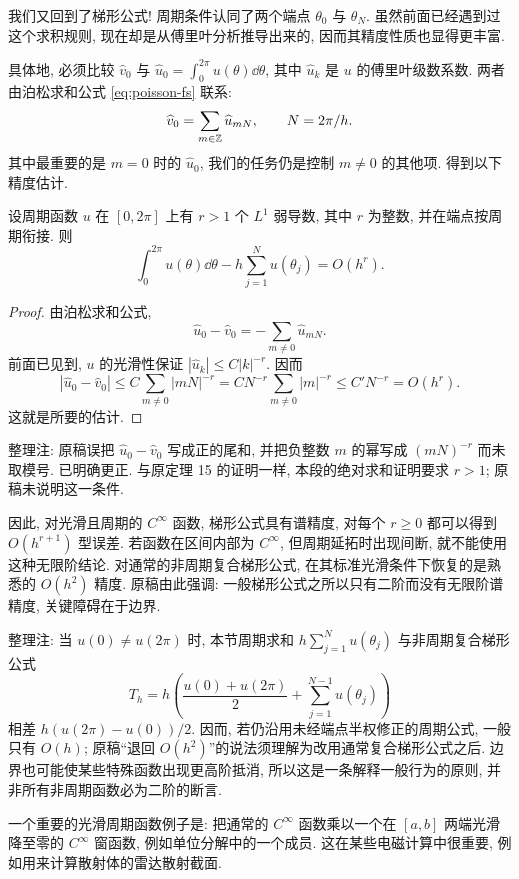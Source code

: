 我们又回到了梯形公式! 周期条件认同了两个端点 $\theta_0$ 与 $\theta_N$. 虽然前面已经遇到过这个求积规则, 现在却是从傅里叶分析推导出来的, 因而其精度性质也显得更丰富.

具体地, 必须比较 $\widehat v_0$ 与 $\widehat u_0=\int_0^{2\pi}u(\theta)\dd\theta$, 其中 $\widehat u_k$ 是 $u$ 的傅里叶级数系数. 两者由泊松求和公式 \eqref{eq:poisson-fs} 联系:
\[
\widehat v_0=\sum_{m\in\mathbb Z}\widehat u_{mN},\qquad N=2\pi/h.
\]
其中最重要的是 $m=0$ 时的 $\widehat u_0$, 我们的任务仍是控制 $m\ne0$ 的其他项. 得到以下精度估计.

\begin{theorem}[周期梯形公式的精度]\label{thm:periodic-trapezoid}
设周期函数 $u$ 在 $[0,2\pi]$ 上有 $r>1$ 个 $L^1$ 弱导数, 其中 $r$ 为整数, 并在端点按周期衔接. 则
\[
\int_0^{2\pi}u(\theta)\dd\theta
-h\sum_{j=1}^{N}u(\theta_j)=O(h^r).
\]
\end{theorem}
\begin{proof}
由泊松求和公式,
\[
\widehat u_0-\widehat v_0=-\sum_{m\ne0}\widehat u_{mN}.
\]
前面已见到, $u$ 的光滑性保证 $|\widehat u_k|\le C|k|^{-r}$. 因而
\[
|\widehat u_0-\widehat v_0|
\le C\sum_{m\ne0}|mN|^{-r}
=C N^{-r}\sum_{m\ne0}|m|^{-r}\le C'N^{-r}=O(h^r).
\]
这就是所要的估计.
\end{proof}
\begin{remark}
整理注: 原稿误把 $\widehat u_0-\widehat v_0$ 写成正的尾和, 并把负整数 $m$ 的幂写成 $(mN)^{-r}$ 而未取模号. 已明确更正. 与原定理 15 的证明一样, 本段的绝对求和证明要求 $r>1$; 原稿未说明这一条件.
\end{remark}

因此, 对光滑且周期的 $C^\infty$ 函数, 梯形公式具有谱精度, 对每个 $r\ge0$ 都可以得到 $O(h^{r+1})$ 型误差. 若函数在区间内部为 $C^\infty$, 但周期延拓时出现间断, 就不能使用这种无限阶结论. 对通常的非周期复合梯形公式, 在其标准光滑条件下恢复的是熟悉的 $O(h^2)$ 精度. 原稿由此强调: 一般梯形公式之所以只有二阶而没有无限阶谱精度, 关键障碍在于边界.
\begin{remark}
整理注: 当 $u(0)\ne u(2\pi)$ 时, 本节周期求和 $h\sum_{j=1}^{N}u(\theta_j)$ 与非周期复合梯形公式
\[
T_h=h\left(\frac{u(0)+u(2\pi)}2+\sum_{j=1}^{N-1}u(\theta_j)\right)
\]
相差 $h(u(2\pi)-u(0))/2$. 因而, 若仍沿用未经端点半权修正的周期公式, 一般只有 $O(h)$; 原稿“退回 $O(h^2)$”的说法须理解为改用通常复合梯形公式之后. 边界也可能使某些特殊函数出现更高阶抵消, 所以这是一条解释一般行为的原则, 并非所有非周期函数必为二阶的断言.
\end{remark}

一个重要的光滑周期函数例子是: 把通常的 $C^\infty$ 函数乘以一个在 $[a,b]$ 两端光滑降至零的 $C^\infty$ 窗函数, 例如单位分解中的一个成员. 这在某些电磁计算中很重要, 例如用来计算散射体的雷达散射截面.

